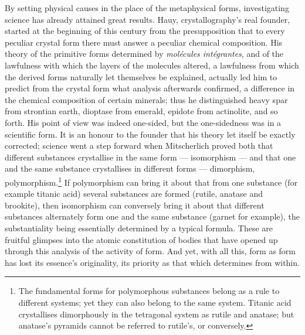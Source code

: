 \documentclass[12pt,a4paper]{book}
\begin{document}
By setting physical causes in the place of the metaphysical forms, investigating science has already attained great
results. Hauy, crystallography's real founder, started at the beginning of this century from the presupposition that to
every peculiar crystal form there must answer a peculiar chemical composition. His theory of the primitive forms
determined by \textit{molécules intégrantes}, and of the lawfulness with which the layers of the molecules altered, a
lawfulness from which the derived forms naturally let themselves be explained, actually led him to predict from the
crystal
form what analysis afterwards confirmed, a difference in the chemical composition of certain minerals; thus he
distinguished heavy spar from strontian earth, dioptase from emerald, epidote from actinolite, and so forth. His point of
view was indeed one-sided, but the one-sidedness was in a scientific form. It is an honour to the founder that his theory
let itself be exactly corrected; science went a step forward when Mitscherlich proved both that different substances
crystallise in the same form --- isomorphism --- and that one and the same substance crystallises in different forms ---
dimorphism, polymorphism.\footnote{%
The fundamental forms for polymorphous substances belong as a rule to different systems; yet they can also belong to the
same system. Titanic acid crystallises dimorphously in the tetragonal system as rutile and anatase; but anatase's
pyramids cannot be referred to rutile's, or conversely.} If polymorphism can bring it about that from one substance (for
example titanic acid) several substances are formed (rutile, anatase and brookite), then isomorphism can conversely bring
it about that different substances alternately form one and the same substance (garnet for example), the substantiality
being essentially determined by a typical formula. These are fruitful glimpses into the atomic constitution of bodies
that have opened up through this analysis of the activity of form. And yet, with all this, form as form has lost its
essence's originality, its priority as that which determines from within.
\end{document}
